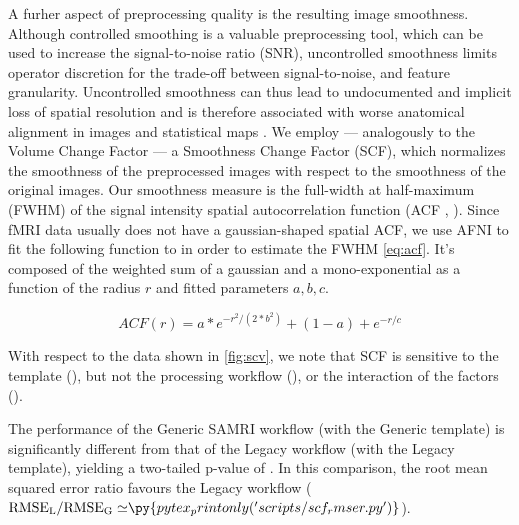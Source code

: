 A furher aspect of preprocessing quality is the resulting image smoothness.
Although controlled smoothing is a valuable preprocessing tool, which can be used to increase the signal-to-noise ratio (SNR), uncontrolled smoothness limits operator discretion for the trade-off between signal-to-noise, and feature granularity.
Uncontrolled smoothness can thus lead to undocumented and implicit loss of spatial resolution and is therefore associated with worse anatomical alignment in images and statistical maps \cite{fmriprep}.
We employ --- analogously to the Volume Change Factor --- a Smoothness Change Factor (SCF), which normalizes the smoothness of the preprocessed images with respect to the smoothness of the original images.
Our smoothness measure is the full-width at half-maximum (FWHM) of the signal intensity spatial autocorrelation function (ACF \cite{eklund2016cluster}, \cite{cox2017fmri}).
Since fMRI data usually does not have a gaussian-shaped spatial ACF, we use AFNI \cite{cox1996afni} to fit the following function to in order to estimate the FWHM \cref{eq:acf}. It's composed of the weighted sum of a gaussian and a mono-exponential as a function of the radius $r$ and fitted parameters $a,b,c$.

\begin{equation} \label{eq:acf}
        ACF(r)
        = a * e^{ -r^{2}/ (2 * b^{2}) } + (1 - a) + e^{-r/c}
\end{equation}

With respect to the data shown in \cref{fig:scv}, we note that SCF is sensitive to
the template (),
but not
the processing workflow (),
or the interaction of the factors ().

The performance of the Generic SAMRI workflow (with the Generic template) is significantly different from that of the Legacy workflow (with the Legacy template), yielding a two-tailed p-value of .
In this comparison, the root mean squared error ratio favours the Legacy workflow
($\mathrm{RMSE_{L}/RMSE_{G}\simeq} \py{pytex_printonly('scripts/scf_rmser.py')}$).

